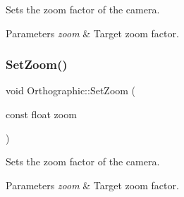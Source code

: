 Sets the zoom factor of the camera. 
\begin{DoxyParams}{Parameters}
{\em zoom} & Target zoom factor. \\
\hline
\end{DoxyParams}
\hypertarget{group___cameras_ga9a63b65c5228dc43caae0b986ea8d220}{}\label{group___cameras_ga9a63b65c5228dc43caae0b986ea8d220} 
\subsubsection{\texorpdfstring{Set\+Zoom()}{SetZoom()}\hspace{0.1cm}{\footnotesize\ttfamily [2/2]}}
{\footnotesize\ttfamily void Orthographic\+::\+Set\+Zoom (\begin{DoxyParamCaption}\item[{const float}]{zoom }\end{DoxyParamCaption})\hspace{0.3cm}{\ttfamily [inline]}}

Sets the zoom factor of the camera. 
\begin{DoxyParams}{Parameters}
{\em zoom} & Target zoom factor. \\
\hline
\end{DoxyParams}
